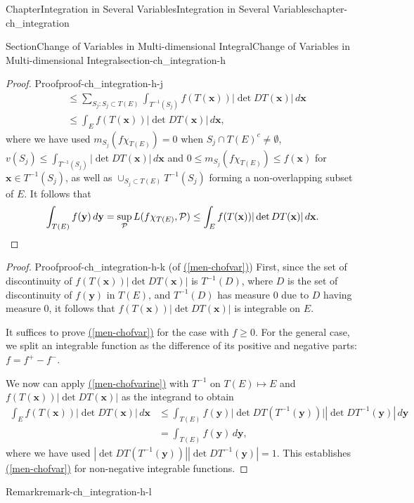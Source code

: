 \documentclass[oneside,10pt,]{book}
\newcommand{\xreffont}{\relax}
\numberwithin{equation}{section}
\newcommand{\qedhere}{\relax}
\newcommand{\bx}{\mathbf{x}}
\newcommand{\by}{\mathbf{y}}
\newcommand{\cP}{\mathcal{P}}
\newcommand{\amp}{&}
\begin{document}
\begin{chapterptx}{Chapter}{Integration in Several Variables}{}{Integration in Several Variables}{}{}{chapter-ch_integration}
\begin{sectionptx}{Section}{Change of Variables in Multi-dimensional Integral}{}{Change of Variables in Multi-dimensional Integral}{}{}{section-ch_integration-h}
\begin{proof}{Proof}{}{proof-ch_integration-h-j}
\begin{align*}
\amp \le  \sum_{S_{j}: S_{j} \subset T(E) } 
\int_{T^{-1}(S_{j})} f(T({\mathbf x})) |\det DT({\mathbf x})|\, d{\mathbf x}\\
\amp \le \int_{E} f(T({\mathbf x})) |\det DT({\mathbf x})|\, d{\mathbf x},
\end{align*}
where we have used \(m_{S_{j}}(f \chi_{T(E)})=0\) when \(S_{j}\cap T(E)^{c}\ne \emptyset\), \(v(S_{j})\le \int_{T^{-1}(S_{j})} |\det DT({\mathbf x})|\, d{\mathbf x}\) and \(0\le m_{S_{j}}(f \chi_{T(E)}) \le f({\mathbf x})\) for \({\mathbf x}\in T^{-1}(S_{j})\), as well as \(\cup_{S_{j}\subset T(E)} T^{-1}(S_{j})\) forming a non-overlapping subset of \(E\).  It follows that%
\begin{equation*}
\int_{T(E)}f({\mathbf y})\, d{\mathbf y} =\sup_{\cP} L(f \chi_{T(E)}, \cP)  \le \int_{E} f(T({\mathbf x})) |\det DT({\mathbf x})|\, d{\mathbf x}.\qedhere
\end{equation*}
%
\end{proof}
\begin{proof}{Proof}{}{proof-ch_integration-h-k}
(of \hyperref[men-chofvar]{({\xreffont\ref{men-chofvar}})}) First, since the set of discontinuity of \(f(T(\bx))|\det DT(\bx)|\) is \(T^{-1}(D)\), where \(D\) is the set of discontinuity of \(f(\by)\) in \(T(E)\), and \(T^{-1}(D)\) has measure \(0\) due to \(D\) having measure \(0\), it follows that \(f(T(\bx))|\det DT(\bx)|\) is integrable on \(E\).%
\par
It suffices to prove \hyperref[men-chofvar]{({\xreffont\ref{men-chofvar}})} for the case with \(f\ge 0\). For the general case, we split an integrable function as the difference of its positive and negative parts: \(f=f^{+}-f^{-}\).%
\par
We now can apply \hyperref[men-chofvarine]{({\xreffont\ref{men-chofvarine}})} with \(T^{-1}\) on \(T(E)\mapsto E\) and \(f(T({\mathbf x})) |\det DT({\mathbf x})|\) as the integrand to obtain%
\begin{align*}
\int_{E} f(T({\mathbf x})) |\det DT({\mathbf x})|\, d{\mathbf x} \amp
\le \int_{T(E)} f({\mathbf y}) \lvert \det DT(T^{-1}({\mathbf y}))\rvert  |\det D T^{-1}({\mathbf y})|\, d{\mathbf y} \\
\amp
= \int_{T(E)} f({\mathbf y})\, d{\mathbf y},
\end{align*}
where we have used \(|\det DT(T^{-1}({\mathbf y}))| |\det D T^{-1} ({\mathbf y})|=1\).  This establishes \hyperref[men-chofvar]{({\xreffont\ref{men-chofvar}})} for non-negative integrable functions.%
\end{proof}
\begin{remark}{Remark}{}{remark-ch_integration-h-l}%

\end{remark}
\end{sectionptx}
\end{chapterptx}
\end{document}
